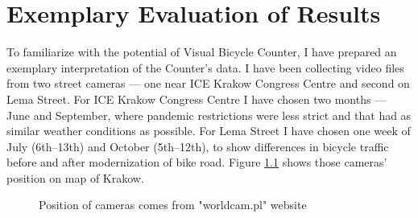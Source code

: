 \chapter{Exemplary Evaluation of Results}
\label{cha:results}
To familiarize with the potential of Visual Bicycle Counter, I have prepared an exemplary interpretation of the Counter's data. I have been collecting video files from two street cameras --- one near ICE Krakow Congress Centre and second on Lema Street. For ICE Krakow Congress Centre I have chosen two months --- June and September, where pandemic restrictions were less strict and that had as similar weather conditions as possible. For Lema Street I have chosen one week of July (6th--13th) and October (5th--12th), to show differences in bicycle traffic before and after modernization of bike road. Figure \ref{fig:map} shows those cameras' position on map of Krakow.
\begin{figure}[H]
    \centering
    \caption{Position of cameras comes from "worldcam.pl" website \cite{mapa}}
    \label{fig:map}
\end{figure}

